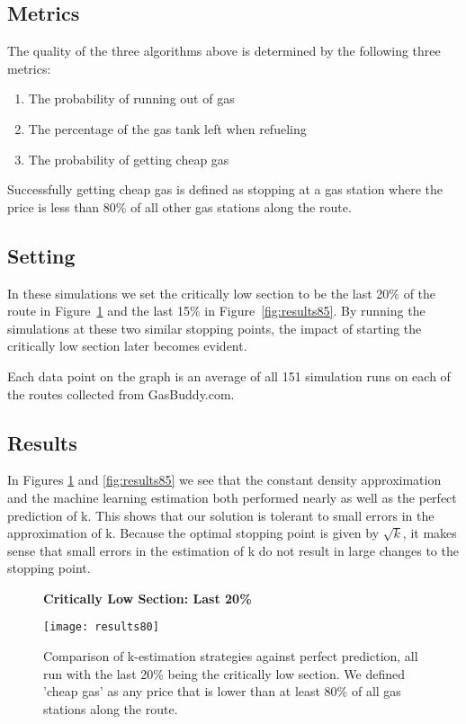 \subsection{Metrics}
The quality of the three algorithms above is determined by the following three metrics:
\begin{enumerate}
\item The probability of running out of gas
\item The percentage of the gas tank left when refueling
\item The probability of getting cheap gas
\end{enumerate}

Successfully getting cheap gas is defined as stopping at a gas station where the price is less than 80\% of all other gas stations along the route.


\subsection{Setting}

In these simulations we set the critically low section to be the last 20\% of the route in Figure~\ref{fig:results80} and the last 15\% in Figure~\ref{fig:results85}. By running the simulations at these two similar stopping points, the impact of starting the critically low section later becomes evident.

Each data point on the graph is an average of all 151 simulation runs on each of the routes collected from GasBuddy.com.


\subsection{Results}

In Figures \ref{fig:results80} and \ref{fig:results85} we see that the constant density approximation and the machine learning estimation both performed nearly as well as the perfect prediction of k. This shows that our solution is tolerant to small errors in the approximation of k. Because the optimal stopping point is given by $\sqrt{k}$, it makes sense that small errors in the estimation of k do not result in large changes to the stopping point.

\begin{figure}
\centering
\textbf{Critically Low Section: Last 20\%}\par\medskip
\texttt{[image: results80]}
\caption{Comparison of k-estimation strategies against perfect prediction, all run with the last 20\% being the critically low section. We defined 'cheap gas' as any price that is lower than at least 80\% of all gas stations along the route.}
\label{fig:results80}
\end{figure}

